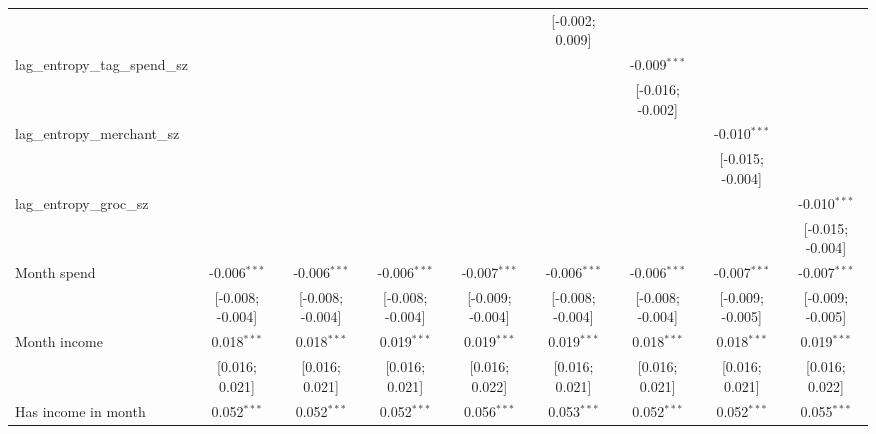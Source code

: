 \begin{table}[htbp]
\begin{threeparttable}[b]
\begin{tabular}{lcccccccc}
                                          &                  &                  &                  &                  & [-0.002; 0.009]  &                  &                  &   \\   
         lag\_entropy\_tag\_spend\_sz     &                  &                  &                  &                  &                  & -0.009$^{***}$   &                  &   \\   
                                          &                  &                  &                  &                  &                  & [-0.016; -0.002] &                  &   \\   
         lag\_entropy\_merchant\_sz       &                  &                  &                  &                  &                  &                  & -0.010$^{***}$   &   \\   
                                          &                  &                  &                  &                  &                  &                  & [-0.015; -0.004] &   \\   
         lag\_entropy\_groc\_sz           &                  &                  &                  &                  &                  &                  &                  & -0.010$^{***}$\\   
                                          &                  &                  &                  &                  &                  &                  &                  & [-0.015; -0.004]\\   
         Month spend                      & -0.006$^{***}$   & -0.006$^{***}$   & -0.006$^{***}$   & -0.007$^{***}$   & -0.006$^{***}$   & -0.006$^{***}$   & -0.007$^{***}$   & -0.007$^{***}$\\   
                                          & [-0.008; -0.004] & [-0.008; -0.004] & [-0.008; -0.004] & [-0.009; -0.004] & [-0.008; -0.004] & [-0.008; -0.004] & [-0.009; -0.005] & [-0.009; -0.005]\\   
         Month income                     & 0.018$^{***}$    & 0.018$^{***}$    & 0.019$^{***}$    & 0.019$^{***}$    & 0.019$^{***}$    & 0.018$^{***}$    & 0.018$^{***}$    & 0.019$^{***}$\\   
                                          & [0.016; 0.021]   & [0.016; 0.021]   & [0.016; 0.021]   & [0.016; 0.022]   & [0.016; 0.021]   & [0.016; 0.021]   & [0.016; 0.021]   & [0.016; 0.022]\\   
         Has income in month              & 0.052$^{***}$    & 0.052$^{***}$    & 0.052$^{***}$    & 0.056$^{***}$    & 0.053$^{***}$    & 0.052$^{***}$    & 0.052$^{***}$    & 0.055$^{***}$\\   

\end{tabular}
\end{threeparttable}
\end{table}
